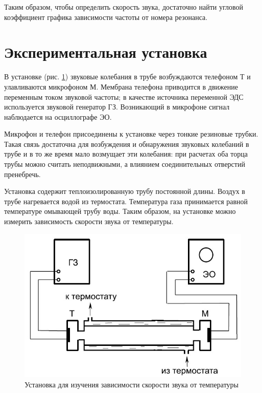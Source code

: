 \documentclass[a4paper,12pt]{article}
\begin{document}
Таким образом, чтобы определить скорость звука, достаточно найти угловой коэффициент графика зависимости частоты от номера резонанса.

\section{Экспериментальная установка}

В установке (рис. \ref{fig:apparatus}) звуковые колебания в трубе возбуждаются телефоном Т и улавливаются микрофоном М. Мембрана телефона приводится в движение переменным током звуковой частоты; в качестве источника переменной ЭДС используется звуковой генератор ГЗ. Возникающий в микрофоне сигнал наблюдается на осциллографе ЭО.

Микрофон и телефон присоединены к установке через тонкие резиновые трубки. Такая связь достаточна для возбуждения и обнаружения звуковых колебаний в трубе и в то же время мало возмущает эти колебания: при расчетах оба торца трубы можно считать неподвижными, а влиянием соединительных отверстий пренебречь.

Установка содержит теплоизолированную трубу постоянной длины. Воздух в трубе нагревается водой из термостата. Температура газа принимается равной температуре омывающей трубу воды. Таким образом, на установке можно измерить зависимость скорости звука от температуры.


\begin{figure}[h]
  \begin{center}
    \includegraphics[width=12cm]{apparatus.jpg}
  \end{center}
  \caption{Установка для изучения зависимости скорости звука от температуры}
  \label{fig:apparatus}
\end{figure}
\end{document}
